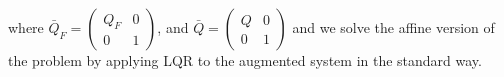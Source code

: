 where 
$\bar{Q}_F = \left(
\begin{array}{cc}
Q_F & 0 \\
0 & 1
\end{array}
\right)$, and 
$\bar{Q} = \left(
\begin{array}{cc}
Q & 0 \\
0 & 1
\end{array}
\right)$ and we solve the affine version of the problem by applying
LQR to the augmented system in the standard way.

